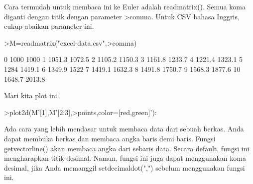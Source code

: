 \documentclass[a4paper,10pt]{article}
\begin{document}
\begin{eulernotebook}
\begin{eulercomment}
\begin{eulercomment}
\begin{eulercomment}
\begin{eulercomment}
\begin{eulercomment}
\begin{eulercomment}
\begin{eulercomment}
\begin{eulercomment}
\begin{eulercomment}
\begin{eulercomment}
\begin{eulercomment}
\begin{eulercomment}
\begin{eulercomment}
\begin{eulercomment}
\begin{eulercomment}
\begin{eulercomment}
\begin{eulercomment}
\begin{eulercomment}
\begin{eulercomment}
\begin{eulercomment}
\begin{eulercomment}
\begin{eulercomment}
\begin{eulercomment}
\begin{eulercomment}
\begin{eulercomment}
\begin{eulercomment}
\begin{eulercomment}
\begin{eulercomment}
\begin{eulercomment}
\begin{eulercomment}
\begin{eulercomment}
\begin{eulercomment}
\begin{eulercomment}
\begin{eulercomment}
\begin{eulercomment}
\begin{eulercomment}
\begin{eulercomment}
Cara termudah untuk membaca ini ke Euler adalah readmatrix(). Semua
koma diganti dengan titik dengan parameter \textgreater{}comma. Untuk CSV bahasa
Inggris, cukup abaikan parameter ini.
\end{eulercomment}
\begin{eulerprompt}
>M=readmatrix("excel-data.csv",>comma)
\end{eulerprompt}
\begin{euleroutput}
          0      1000      1000 
          1    1051.3    1072.5 
          2    1105.2    1150.3 
          3    1161.8    1233.7 
          4    1221.4    1323.1 
          5      1284    1419.1 
          6    1349.9      1522 
          7    1419.1    1632.3 
          8    1491.8    1750.7 
          9    1568.3    1877.6 
         10    1648.7    2013.8 
\end{euleroutput}
\begin{eulercomment}
Mari kita plot ini.
\end{eulercomment}
\begin{eulerprompt}
>plot2d(M'[1],M'[2:3],>points,color=[red,green]'):
\end{eulerprompt}
\begin{eulercomment}
Ada cara yang lebih mendasar untuk membaca data dari sebuah berkas.
Anda dapat membuka berkas dan membaca angka baris demi baris. Fungsi
getvectorline() akan membaca angka dari sebaris data. Secara default,
fungsi ini mengharapkan titik desimal. Namun, fungsi ini juga dapat
menggunakan koma desimal, jika Anda memanggil setdecimaldot(",")
sebelum menggunakan fungsi ini.


\end{eulercomment}
\end{eulercomment}
\end{eulercomment}
\end{eulercomment}
\end{eulercomment}
\end{eulercomment}
\end{eulercomment}
\end{eulercomment}
\end{eulercomment}
\end{eulercomment}
\end{eulercomment}
\end{eulercomment}
\end{eulercomment}
\end{eulercomment}
\end{eulercomment}
\end{eulercomment}
\end{eulercomment}
\end{eulercomment}
\end{eulercomment}
\end{eulercomment}
\end{eulercomment}
\end{eulercomment}
\end{eulercomment}
\end{eulercomment}
\end{eulercomment}
\end{eulercomment}
\end{eulercomment}
\end{eulercomment}
\end{eulercomment}
\end{eulercomment}
\end{eulercomment}
\end{eulercomment}
\end{eulercomment}
\end{eulercomment}
\end{eulercomment}
\end{eulercomment}
\end{eulercomment}
\end{eulernotebook}
\end{document}
